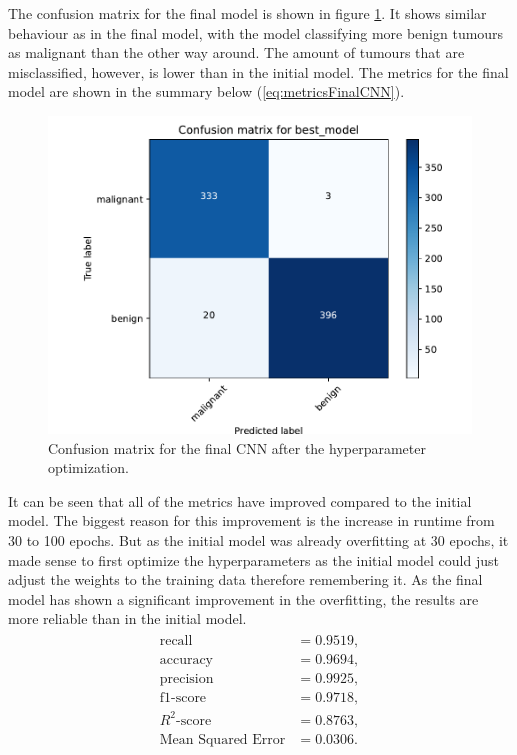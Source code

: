 The confusion matrix for the final model is shown in figure \ref{fig:confusionMatrixFinal}.
It shows similar behaviour as in the final model, with the model classifying more benign tumours as malignant than the other way around.
The amount of tumours that are misclassified, however, is lower than in the initial model.
The metrics for the final model are shown in the summary below (\ref{eq:metricsFinalCNN}). \newline
\begin{figure}
    \centering
    \includegraphics[width=.48\textwidth]{plots/confusion_matrix_best_model.pdf}
    \caption{Confusion matrix for the final CNN after the hyperparameter optimization.}
    \label{fig:confusionMatrixFinal}
\end{figure}
\noindent
It can be seen that all of the metrics have improved compared to the initial model.
The biggest reason for this improvement is the increase in runtime from 30 to 100 epochs.
But as the initial model was already overfitting at 30 epochs, it made sense to first optimize the hyperparameters as the initial model could just adjust the weights to the training data therefore remembering it.
As the final model has shown a significant improvement in the overfitting, the results are more reliable than in the initial model. \newline
\begin{align}
    \label{eq:metricsFinalCNN}
    \begin{split}
        \text{recall} &= 0.9519, \\
        \text{accuracy} &= 0.9694, \\
        \text{precision} &= 0.9925, \\
        \text{f1-score} &= 0.9718, \\
        R^2\text{-score} &= 0.8763, \\
        \text{Mean Squared Error} &= 0.0306.
    \end{split}
\end{align}
